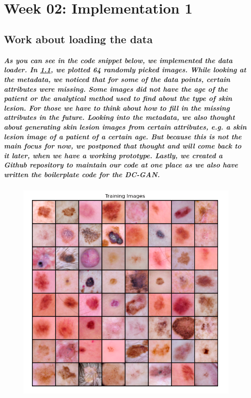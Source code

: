 \newpage
\chapter{Week 02: Implementation 1}
\section{Work about loading the data}
\paragraph{
As you can see in the code snippet below, we implemented the data loader. In \ref{fig:dataplot}, we plotted 64 randomly picked images. While looking at the metadata, we noticed that for some of the data points, certain attributes were missing. Some images did not have the age of the patient or the analytical method used to find about the type of skin lesion. For those we have to think about how to fill in the missing attributes in the future. Looking into the metadata, we also thought about generating skin lesion images from certain attributes, e.g. a skin lesion image of a patient of a certain age. But because this is not the main focus for now, we postponed that thought and will come back to it later, when we have a working prototype. Lastly, we created a Github repository to maintain our code at one place as we also have written the boilerplate code for the DC-GAN.
}

\begin{figure}[htbp]
    \centering
    \includegraphics[width=5in]{images/sample_plot.png}
    \label{fig:dataplot}
\end{figure}

